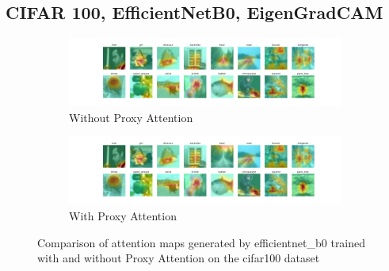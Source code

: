 \subsection{CIFAR 100, EfficientNetB0, EigenGradCAM}
\begin{figure}[H]
    \begin{subfigure}[b]{1\textwidth}
        \includegraphics[width=\linewidth]{images/cifar100_efficientnet_b0_noproxy_0.pdf}
        \caption{Without Proxy Attention}
    \end{subfigure}
    \begin{subfigure}[b]{1\textwidth}
        \includegraphics[width=\linewidth]{images/cifar100_efficientnet_b0_proxy_0.pdf}
        \caption{With Proxy Attention}
    \end{subfigure}

    \caption{Comparison of attention maps generated by efficientnet\_b0 trained with and without Proxy Attention on the cifar100 dataset}
    \label{fig:efficientnet_b0_cifar100}
\end{figure}
    


